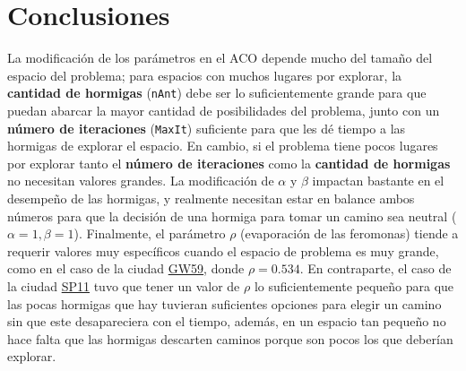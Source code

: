 \documentclass[12pt, a4paper]{article}
\begin{document}
\section{Conclusiones}
La modificación de los parámetros en el ACO depende mucho del tamaño del espacio del problema; para espacios con muchos lugares por explorar, la \textbf{cantidad de hormigas} (\lstinline{nAnt}) debe ser lo suficientemente grande para que puedan abarcar la mayor cantidad de posibilidades del problema, junto con un \textbf{número de iteraciones} (\lstinline{MaxIt}) suficiente para que les dé tiempo a las hormigas de explorar el espacio. En cambio, si el problema tiene pocos lugares por explorar tanto el \textbf{número de iteraciones} como la \textbf{cantidad de hormigas} no necesitan valores grandes. La modificación de $\alpha$ y $\beta$ impactan bastante en el desempeño de las hormigas, y realmente necesitan estar en balance ambos números para que la decisión de una hormiga para tomar un camino sea neutral ($\alpha=1,\beta=1$). Finalmente, el parámetro $\rho$ (evaporación de las feromonas) tiende a requerir valores muy específicos cuando el espacio de problema es muy grande, como en el caso de la ciudad \href{subsec:gw59}{GW59}, donde $\rho=0.534$. En contraparte, el caso de la ciudad \href{subsec:sp11}{SP11} tuvo que tener un valor de $\rho$ lo suficientemente pequeño para que las pocas hormigas que hay tuvieran suficientes opciones para elegir un camino sin que este desapareciera con el tiempo, además, en un espacio tan pequeño no hace falta que las hormigas descarten caminos porque son pocos los que deberían explorar.



\nocite{*}
\end{document}
